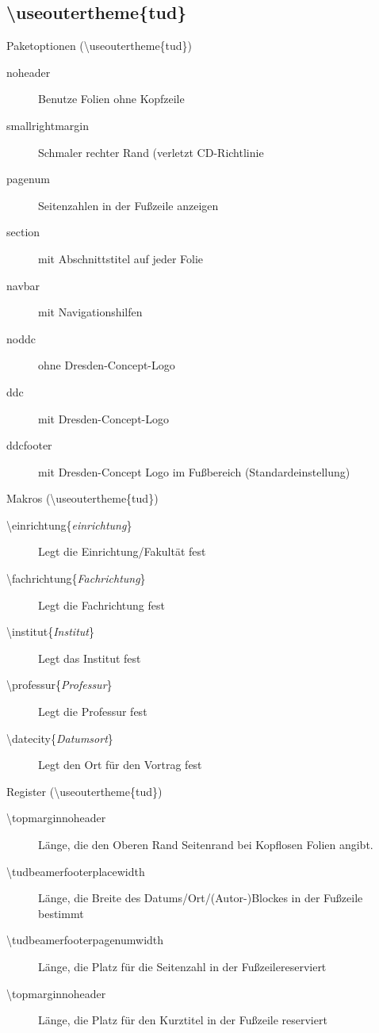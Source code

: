 \documentclass[presentation,t]{beamer}
\begin{document}
\subsection{\textbackslash useoutertheme\{tud\}}
\label{sec-2-2}
\begin{frame}[label=sec-2-2-1]{Paketoptionen (\textbackslash useoutertheme\{tud\})}
\begin{description}
\item[{noheader}] Benutze Folien ohne Kopfzeile
\item[{smallrightmargin}] Schmaler rechter Rand (verletzt CD-Richtlinie
\item[{pagenum}] Seitenzahlen in der Fußzeile anzeigen
\item[{section}] mit Abschnittstitel auf jeder Folie
\item[{navbar}] mit Navigationshilfen
\item[{noddc}] ohne Dresden-Concept-Logo
\item[{ddc}] mit Dresden-Concept-Logo
\item[{ddcfooter}] mit Dresden-Concept Logo im Fußbereich (Standardeinstellung)
\end{description}
\end{frame}
\begin{frame}[label=sec-2-2-2]{Makros (\textbackslash useoutertheme\{tud\})}
\begin{description}
\item[{\textbackslash einrichtung\{\emph{einrichtung}\}}] Legt die
Einrichtung/Fakultät fest
\item[{\textbackslash fachrichtung\{\emph{Fachrichtung}\}}] Legt die
Fachrichtung fest
\item[{\textbackslash institut\{\emph{Institut}\}}] Legt das
Institut fest
\item[{\textbackslash professur\{\emph{Professur}\}}] Legt die
Professur fest
\item[{\textbackslash datecity\{\emph{Datumsort}\}}] Legt den Ort für den Vortrag fest
\end{description}
\end{frame}
\begin{frame}[label=sec-2-2-3]{Register (\textbackslash useoutertheme\{tud\})}
\begin{description}
\item[{\textbackslash topmarginnoheader}] Länge, die den Oberen Rand Seitenrand bei
Kopflosen Folien angibt.
\item[{\textbackslash tudbeamerfooterplacewidth}] Länge, die Breite des
Datums/Ort/(Autor-)Blockes in der Fußzeile bestimmt
\item[{\textbackslash tudbeamerfooterpagenumwidth}] Länge, die Platz für
die Seitenzahl in der Fußzeilereserviert
\item[{\textbackslash topmarginnoheader}] Länge, die Platz für den
Kurztitel in der Fußzeile reserviert
\end{description}
\end{frame}
\end{document}
